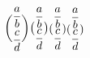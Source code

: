 $
\displaystyle {\displaystyle{a\over b}\choose \displaystyle{c\over d}}
\textstyle {\displaystyle{a\over b}\choose \displaystyle{c\over d}}
\scriptstyle {\displaystyle{a\over b}\choose \displaystyle{c\over d}}
\scriptscriptstyle {\displaystyle{a\over b}\choose \displaystyle{c\over d}}
$
